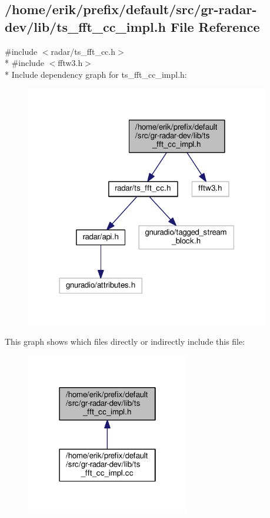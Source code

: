 \subsection{/home/erik/prefix/default/src/gr-\/radar-\/dev/lib/ts\+\_\+fft\+\_\+cc\+\_\+impl.h File Reference}
\label{ts__fft__cc__impl_8h}
{\ttfamily \#include $<$radar/ts\+\_\+fft\+\_\+cc.\+h$>$}\\*
{\ttfamily \#include $<$fftw3.\+h$>$}\\*
Include dependency graph for ts\+\_\+fft\+\_\+cc\+\_\+impl.\+h\+:
\nopagebreak
\begin{figure}[H]
\begin{center}
\leavevmode
\includegraphics[width=302pt]{dc/d11/ts__fft__cc__impl_8h__incl}
\end{center}
\end{figure}
This graph shows which files directly or indirectly include this file\+:
\nopagebreak
\begin{figure}[H]
\begin{center}
\leavevmode
\includegraphics[width=202pt]{d0/df0/ts__fft__cc__impl_8h__dep__incl}
\end{center}
\end{figure}
